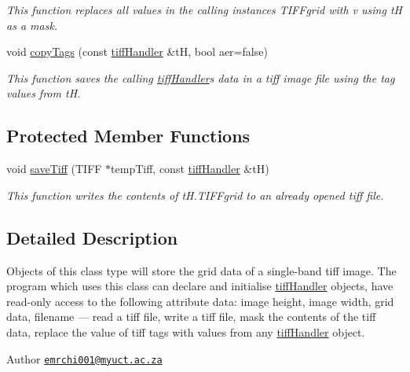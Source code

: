 \begin{DoxyCompactItemize}
\begin{DoxyCompactList}\small\item\em This function replaces all values in the calling instance\textquotesingle{}s T\+I\+F\+Fgrid with v using tH as a mask. \end{DoxyCompactList}\item 
void \hyperlink{classtiffHandler_a2a813af9ec1e322fafc0d5e0a3593cbc}{copy\+Tags} (const \hyperlink{classtiffHandler}{tiff\+Handler} \&tH, bool aer=false)
\begin{DoxyCompactList}\small\item\em This function saves the calling \hyperlink{classtiffHandler}{tiff\+Handler}\textquotesingle{}s data in a tiff image file using the tag values from tH. \end{DoxyCompactList}\end{DoxyCompactItemize}
\subsection*{Protected Member Functions}
\begin{DoxyCompactItemize}
\item 
void \hyperlink{classtiffHandler_a691f65932d0dddc162689603efe9b56b}{save\+Tiff} (T\+I\+FF $\ast$temp\+Tiff, const \hyperlink{classtiffHandler}{tiff\+Handler} \&tH)
\begin{DoxyCompactList}\small\item\em This function writes the contents of t\+H.\+T\+I\+F\+Fgrid to an already opened tiff file. \end{DoxyCompactList}\end{DoxyCompactItemize}


\subsection{Detailed Description}
Objects of this class type will store the grid data of a single-\/band tiff image. The program which uses this class can declare and initialise \hyperlink{classtiffHandler}{tiff\+Handler} objects, have read-\/only access to the following attribute data\+: image height, image width, grid data, filename --- read a tiff file, write a tiff file, mask the contents of the tiff data, replace the value of tiff tags with values from any \hyperlink{classtiffHandler}{tiff\+Handler} object. 

\begin{DoxyAuthor}{Author}
\href{mailto:emrchi001@myuct.ac.za}{\tt emrchi001@myuct.\+ac.\+za} 
\end{DoxyAuthor}


